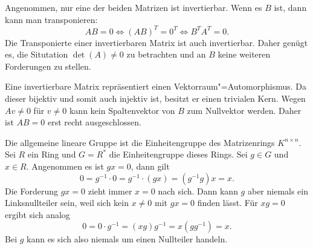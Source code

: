 \documentclass[a4paper,10pt,fleqn,twoside]{scrartcl}
\numberwithin{equation}{section}
\theoremstyle{Aufgabe}
\begin{document}
Angenommen, nur eine der beiden Matrizen ist invertierbar. Wenn es
$B$ ist, dann kann man transponieren:%
\begin{equation}
AB=0 \iff (AB)^T = 0^T \iff B^T A^T = 0.
\end{equation}
Die Transponierte einer invertierbaren Matrix ist auch invertierbar.
Daher genügt es, die Situtation $\det(A)\ne 0$ zu betrachten
und an $B$ keine weiteren Forderungen zu stellen.

Eine invertierbare Matrix repräsentiert einen
Vektorraum"=Automorphismus. Da dieser bijektiv und somit auch injektiv
ist, besitzt er einen trivialen Kern. Wegen $Av\ne 0$ für $v\ne 0$
kann kein Spaltenvektor von $B$ zum Nullvektor werden. Daher ist $AB=0$
erst recht ausgeschlossen.

Die allgemeine lineare Gruppe ist die Einheitengruppe des Matrizenrings
$K^{n\times n}$. Sei $R$ ein Ring und $G=R^*$ die Einheitengruppe
dieses Rings. Sei $g\in G$ und $x\in R$. Angenommen es ist $gx=0$,
dann gilt%
\begin{equation}
0 = g^{-1}\cdot 0 = g^{-1}\cdot (gx) = (g^{-1}g)x = x.
\end{equation}
Die Forderung $gx=0$ zieht immer $x=0$ nach sich. Dann kann $g$ aber
niemals ein Linksnullteiler sein, weil sich kein $x\ne 0$ mit $gx=0$
finden lässt. Für $xg=0$ ergibt sich analog%
\begin{equation}
0 = 0\cdot g^{-1} = (xg)g^{-1} = x(gg^{-1}) = x.
\end{equation}
Bei $g$ kann es sich also niemals um einen Nullteiler handeln.
\end{document}
